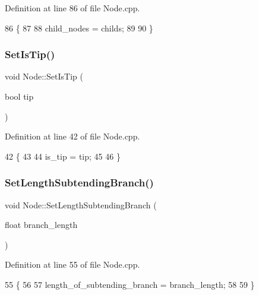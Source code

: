 Definition at line 86 of file Node.\+cpp.


\begin{DoxyCode}
86                                                 \{
87   
88   child\_nodes = childs;
89   
90 \}
\end{DoxyCode}
\mbox{\label{classNode_a89bff92e3930d521439395ccf332418f}} 
\subsubsection{\texorpdfstring{Set\+Is\+Tip()}{SetIsTip()}}
{\footnotesize\ttfamily void Node\+::\+Set\+Is\+Tip (\begin{DoxyParamCaption}\item[{bool}]{tip }\end{DoxyParamCaption})}



Definition at line 42 of file Node.\+cpp.


\begin{DoxyCode}
42                            \{
43   
44   is\_tip = tip;
45   
46 \}
\end{DoxyCode}
\mbox{\label{classNode_a9d7592d6bf479825eb411a244f4d7ad2}} 
\subsubsection{\texorpdfstring{Set\+Length\+Subtending\+Branch()}{SetLengthSubtendingBranch()}}
{\footnotesize\ttfamily void Node\+::\+Set\+Length\+Subtending\+Branch (\begin{DoxyParamCaption}\item[{float}]{branch\+\_\+length }\end{DoxyParamCaption})}



Definition at line 55 of file Node.\+cpp.


\begin{DoxyCode}
55                                                         \{
56   
57   length\_of\_subtending\_branch = branch\_length;
58   
59 \}
\end{DoxyCode}
\mbox{\label{classNode_acb22b8f28ca70e1316a6bafc375ee352}} 
